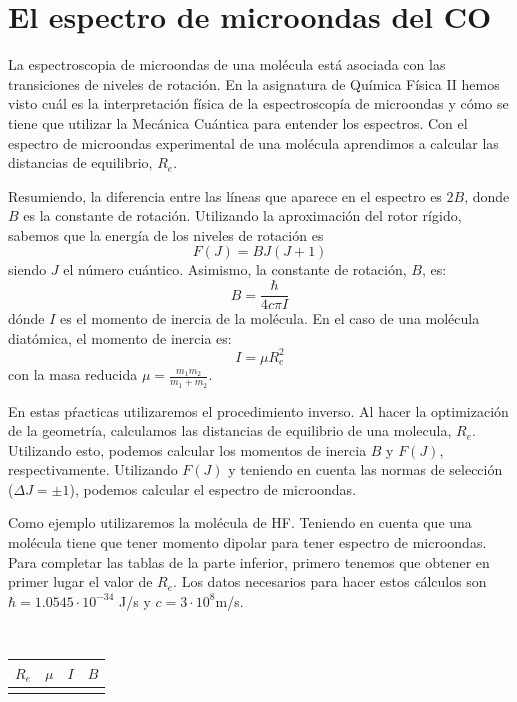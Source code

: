 \documentclass{tufte-book}
\begin{document}
\section{El espectro de microondas del CO}
La espectroscopia de microondas de una molécula está 
asociada con las transiciones de niveles de rotación.
En la asignatura de Química Física II hemos 
visto cuál es la interpretación física de la espectroscopía
de microondas y cómo se tiene que utilizar la Mecánica Cuántica 
para entender los espectros. Con el espectro de microondas
experimental de una molécula aprendimos a calcular las 
distancias de equilibrio, $R_e$.

Resumiendo, la diferencia entre las líneas que aparece 
en el espectro es $2B$, donde $B$ es la constante de rotación.
Utilizando la aproximación del rotor rígido, sabemos 
que la energía de los niveles de rotación es
\begin{equation}
    F(J) = BJ(J+1)
\end{equation}
siendo $J$ el número cuántico. Asimismo, la constante de 
rotación, $B$, es:
\begin{equation}
    B = \frac{\hbar}{4c\pi I}
\end{equation}
dónde $I$ es el momento de inercia de la molécula. En el 
caso de una molécula diatómica, el momento de inercia es:
\begin{equation}
    I = \mu R_e^2
\end{equation}
con la masa reducida $\mu=\frac{m_1m_2}{m_1+m_2}$.

En estas pŕacticas utilizaremos el procedimiento inverso. Al hacer
la optimización de la geometría, calculamos las distancias de
equilibrio de una molecula, $R_e$. Utilizando esto, podemos
calcular los momentos de inercia $B$ y $F(J)$, respectivamente.
Utilizando $F(J)$ y teniendo en cuenta las normas de selección
($\Delta J=\pm1$), podemos calcular el espectro de microondas.

Como ejemplo utilizaremos la molécula de HF. Teniendo en cuenta
que una molécula tiene que tener momento dipolar para tener
espectro de microondas. Para completar las tablas de la parte
inferior, primero tenemos que obtener en primer lugar el valor de
$R_e$. Los datos necesarios para hacer estos cálculos son
$\hbar=1.0545·10^{-34}$ J/s y $c=3·10^8$m/s.

\begin{table}[h!]
\centering 
	\scriptsize
	\begin{tabular}{llll}
	\toprule
	    $R_e$ & $\mu$ & $I$ & $B$  \\
	\midrule	
	     &&  &  \\
	\bottomrule	
    \end{tabular}
\end{table}
\end{document}
